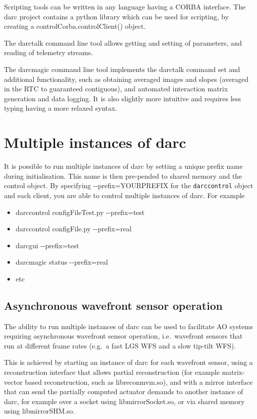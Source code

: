 \documentclass[a4,10pt]{article}
\begin{document}
Scripting tools can be written in any language having a CORBA
interface.  The darc project contains a python library which can be
used for scripting, by creating a controlCorba.controlClient() object.

The darctalk command line tool allows getting and setting of
parameters, and reading of telemetry streams.

The darcmagic command line tool implements the darctalk command set
and additional functionality, such as obtaining averaged images and
slopes (averaged in the RTC to guaranteed contiguous), and automated
interaction matrix generation and data logging.  It is also slightly
more intuitive and requires less typing having a more relaxed syntax.

\section{Multiple instances of darc}
It is possible to run multiple instances of darc by setting a unique prefix
name during initialisation.  This name is then pre-pended to shared
memory and the control object.  By specifying -{-}prefix=YOURPREFIX for
the {\tt darccontrol} object and each client, you are able to control
multiple instances of darc.  For example
\begin{itemize}
\item darccontrol configFileTest.py -{-}prefix=test
\item darccontrol configFile.py -{-}prefix=real
\item darcgui -{-}prefix=test
\item darcmagic status -{-}prefix=real
\item etc
\end{itemize}

\subsection{Asynchronous wavefront sensor operation}
The ability to run multiple instances of darc can be used to
facilitate AO systems requiring asynchronous wavefront sensor
operation, i.e.\ wavefront sensors that run at different frame rates
(e.g.\ a fast LGS WFS and a slow tip-tilt WFS).

This is achieved by starting an instance of darc for each wavefront
sensor, using a reconstruction interface that allows partial
reconstruction (for example matrix-vector based reconstruction, such
as libreconmvm.so), and with a mirror interface that can send the
partially computed actuator demands to another instance of darc, for
example over a socket using libmirrorSocket.so, or via shared memory
using libmirrorSHM.so.
\end{document}
